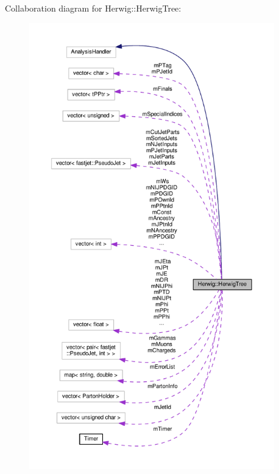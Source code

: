 Collaboration diagram for Herwig\+:\+:Herwig\+Tree\+:\nopagebreak
\begin{figure}[H]
\begin{center}
\leavevmode
\includegraphics[height=550pt]{class_herwig_1_1_herwig_tree__coll__graph}
\end{center}
\end{figure}
